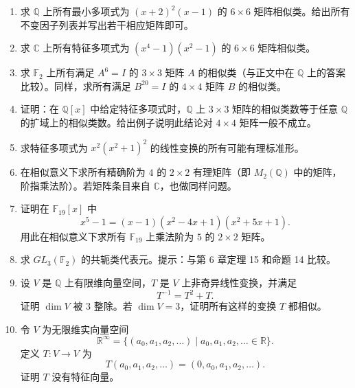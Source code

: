 \begin{enumerate}[label=\arabic*.]
\item 求 $\mathbb Q$ 上所有最小多项式为 $(x+2)^2(x-1)$ 的 $6\times6$ 矩阵相似类。给出所有不变因子列表并写出若干相应矩阵即可。

\item 求 $\mathbb C$ 上所有特征多项式为 $(x^4-1)(x^2-1)$ 的 $6\times6$ 矩阵相似类。

\item 求 $\mathbb F_2$ 上所有满足 $A^6=I$ 的 $3\times3$ 矩阵 $A$ 的相似类（与正文中在 $\mathbb Q$ 上的答案比较）。同样，求所有满足 $B^{20}=I$ 的 $4\times4$ 矩阵 $B$ 的相似类。

\item 证明：在 $\mathbb Q[x]$ 中给定特征多项式时，$\mathbb Q$ 上 $3\times3$ 矩阵的相似类数等于任意 $\mathbb Q$ 的扩域上的相似类数。给出例子说明此结论对 $4\times4$ 矩阵一般不成立。

\item 求特征多项式为 $x^2(x^2+1)^2$ 的线性变换的所有可能有理标准形。

\item 在相似意义下求所有精确阶为 $4$ 的 $2\times2$ 有理矩阵（即 $M_2(\mathbb Q)$ 中的矩阵，阶指乘法阶）。若矩阵条目来自 $\mathbb C$，也做同样问题。

\item 证明在 $\mathbb F_{19}[x]$ 中
\[
x^5-1=(x-1)(x^2-4x+1)(x^2+5x+1).
\]
用此在相似意义下求所有 $\mathbb F_{19}$ 上乘法阶为 $5$ 的 $2\times2$ 矩阵。

\item 求 $GL_3(\mathbb F_2)$ 的共轭类代表元。提示：与第 6 章定理 15 和命题 14 比较。

\item 设 $V$ 是 $\mathbb Q$ 上有限维向量空间，$T$ 是 $V$ 上非奇异线性变换，并满足
\[
T^{-1}=T^2+T.
\]
证明 $\dim V$ 被 $3$ 整除。若 $\dim V=3$，证明所有这样的变换 $T$ 都相似。

\item 令 $V$ 为无限维实向量空间
\[
\mathbb R^\infty=\{(a_0,a_1,a_2,
\ldots)\mid a_0,a_1,a_2,
\ldots\in\mathbb R\}.
\]
定义 $T:V\to V$ 为
\[
T(a_0,a_1,a_2,
\ldots)=(0,a_0,a_1,a_2,
\ldots).
\]
证明 $T$ 没有特征向量。


\end{enumerate}
